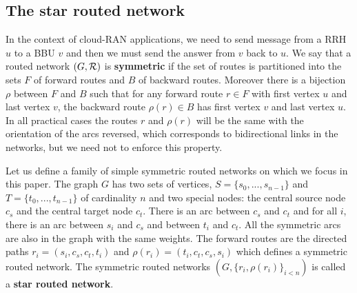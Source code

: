 \documentclass[10pt, conference, letterpaper]{IEEEtran}
\begin{document}
      
    
    \subsection{The star routed network}
    
          In the context of cloud-RAN applications, we need to send message from a RRH $u$ to a BBU $v$ and then 
      we must send the answer from $v$ back to $u$. We say that a routed network $(G, {\cal R})$ is \textbf{symmetric} if the set of routes is partitioned into the sets $F$ of forward routes and $B$ of backward routes. Moreover there is a bijection $\rho$ between $F$ and $B$ such that for any forward route $r \in F$ with first vertex $u$ and last vertex $v$, the backward route $\rho(r) \in B$ has first vertex $v$ and last vertex $u$. In all practical cases the routes $r$ and $\rho(r)$ will be the same with the orientation of the arcs reversed, which corresponds to bidirectional links in the networks, but we need not to enforce this property.
      
      Let us define a family of simple symmetric routed networks on which we focus in this paper. 
      The graph $G$ has two sets of vertices, $S=\{s_0,...,s_{n-1}\}$ and $T=\{t_0,...,t_{n-1}\}$ of cardinality $n$ and two special nodes:
      the central source node {\bf $c_s$} and the central target node {\bf $c_t$}.
      There is an arc between {\bf $c_s$} and {\bf $c_t$} and for all $i$, there is an arc between $s_i$ and $c_s$ and between $t_i$ and $c_t$.
      All the symmetric arcs are also in the graph with the same weights.
      The forward routes are the directed paths $r_i = (s_i,c_s,c_t,t_i)$ and $\rho(r_i) = (t_i,c_t,c_s,s_i)$ which defines a symmetric routed network. 
      The symmetric routed networks $(G, \{r_i,\rho(r_i)\}_{i<n})$ is called a \textbf{star routed network}.
      
       \begin{center}

  \end{center}
	
\end{document}
